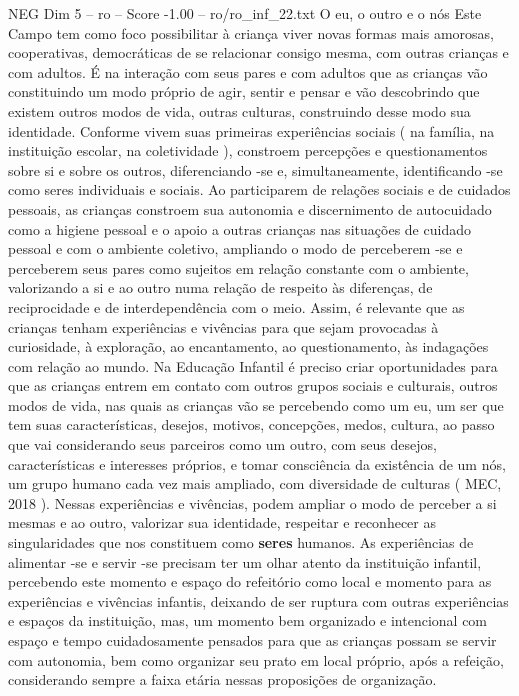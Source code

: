 \begin{textsample}{NEG Dim 5 – ro – Score -1.00 – ro/ro\_inf\_22.txt}  \label{ex:f5_neg_180}
O eu, o outro e o nós Este Campo tem como foco possibilitar à criança viver novas formas mais amorosas, cooperativas, democráticas de se relacionar consigo mesma, com outras crianças e com adultos.
É na interação com seus pares e com adultos que as crianças vão constituindo um modo próprio de agir, sentir e pensar e vão descobrindo que existem outros modos de vida, outras culturas, construindo desse modo sua identidade.
Conforme vivem suas primeiras experiências sociais ( na família, na instituição escolar, na coletividade ), constroem percepções e questionamentos sobre si e sobre os outros, diferenciando -se e, simultaneamente, identificando -se como seres individuais e sociais.
Ao participarem de relações sociais e de cuidados pessoais, as crianças constroem sua autonomia e discernimento de autocuidado como a higiene pessoal e o apoio a outras crianças nas situações de cuidado pessoal e com o ambiente coletivo, ampliando o modo de perceberem -se e perceberem seus pares como sujeitos em relação constante com o ambiente, valorizando a si e ao outro numa relação de respeito às diferenças, de reciprocidade e de interdependência com o meio.
Assim, é relevante que as crianças tenham experiências e vivências para que sejam provocadas à curiosidade, à exploração, ao encantamento, ao questionamento, às indagações com relação ao mundo.
Na Educação Infantil é preciso criar oportunidades para que as crianças entrem em contato com outros grupos sociais e culturais, outros modos de vida, nas quais as crianças vão se percebendo como um eu, um ser que tem suas características, desejos, motivos, concepções, medos, cultura, ao passo que vai considerando seus parceiros como um outro, com seus desejos, características e interesses próprios, e tomar consciência da existência de um nós, um grupo humano cada vez mais ampliado, com diversidade de culturas ( MEC, 2018 ).
Nessas experiências e vivências, podem ampliar o modo de perceber a si mesmas e ao outro, valorizar sua identidade, respeitar e reconhecer as singularidades que nos constituem como \textbf{seres} humanos.
As experiências de alimentar -se e servir -se precisam ter um olhar atento da instituição infantil, percebendo este momento e espaço do refeitório como local e momento para as experiências e vivências infantis, deixando de ser ruptura com outras experiências e espaços da instituição, mas, um momento bem organizado e intencional com espaço e tempo cuidadosamente pensados para que as crianças possam se servir com autonomia, bem como organizar seu prato em local próprio, após a refeição, considerando sempre a faixa etária nessas proposições de organização.

\end{textsample}
